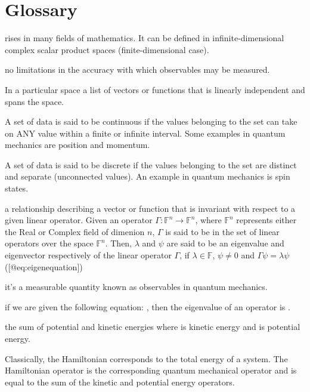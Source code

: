 \documentclass[12pt,]{book}
\providecommand{\tightlist}{%
  \setlength{\itemsep}{0pt}\setlength{\parskip}{0pt}}
\begin{document}
\section{Glossary}\label{glossary}

\begin{description}
\tightlist
\item[Adjoint]
rises in many fields of mathematics. It can be defined in
infinite-dimensional complex scalar product spaces (finite-dimensional
case).
\item[Boundary Conditions]
\item[Classical Mechanics]
no limitations in the accuracy with which observables may be measured.
\item[Complete Basis Set]
In a particular space a list of vectors or functions that is linearly
independent and spans the space.
\item[Continuous]
A set of data is said to be continuous if the values belonging to the
set can take on ANY value within a finite or infinite interval. Some
examples in quantum mechanics are position and momentum.
\item[Difference Matrix]
\item[Differentiable]
\item[Differential Operator]
\item[Discrete]
A set of data is said to be discrete if the values belonging to the set
are distinct and separate (unconnected values). An example in quantum
mechanics is spin states.
\item[Eigenequation]
a relationship describing a vector or function that is invariant with
respect to a given linear operator. Given an operator
\(\Gamma: \mathbb{F}^n \to \mathbb{F}^n\), where \(\mathbb{F}^n\)
represents either the Real or Complex field of dimenion \(n\),
\(\Gamma\) is said to be in the set of linear operators over the space
\(\mathbb{F}^n\). Then, \(\lambda\) and \(\psi\) are said to be an
eigenvalue and eigenvector respectively of the linear operator
\(\Gamma\), if \(\lambda\in\mathbb{F}\), \(\psi\neq0\) and
\(\Gamma\psi=\lambda\psi\) ({[}@eq:eigenequation{]})
\item[Eigenfunction]
\item[Eigenvector]
it's a measurable quantity known as observables in quantum mechanics.
\item[Eigenvalue]
if we are given the following equation: , then the eigenvalue of an
operator is .
\item[Energy]
the sum of potential and kinetic energies where is kinetic energy and is
potential energy.
\item[Hamiltonian Operator]
Classically, the Hamiltonian corresponds to the total energy of a
system. The Hamiltonian operator is the corresponding quantum mechanical
operator and is equal to the sum of the kinetic and potential energy
operators.


\end{description}
\end{document}
